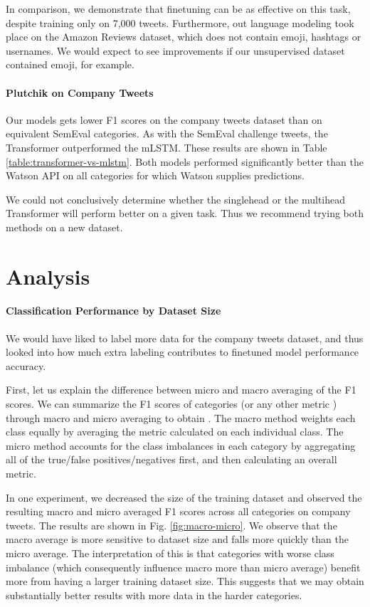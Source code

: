 \documentclass[letterpaper]{article} \usepackage{aaai19}  \usepackage{times}  \usepackage{helvet}  \usepackage{courier}  \usepackage{url}  \usepackage{graphicx}  \usepackage{booktabs}
\begin{document}
In comparison, we demonstrate that finetuning can be as effective on this task, despite training only on 7,000 tweets. Furthermore, out language modeling took place on the Amazon Reviews dataset, which does not contain emoji, hashtags or usernames. We would expect to see improvements if our unsupervised dataset contained emoji, for example.


\paragraph{Plutchik on Company Tweets}
Our models gets lower F1 scores on  the company tweets dataset than on equivalent SemEval categories. 
As with the SemEval challenge tweets, the Transformer outperformed the mLSTM. These results are shown in Table \ref{table:transformer-vs-mlstm}. Both models performed significantly better than the Watson API on all categories for which Watson supplies predictions.

We could not conclusively determine whether the singlehead or the multihead Transformer will perform better on a given task. Thus we recommend trying both methods on a new dataset.


\section{Analysis}

\paragraph{Classification Performance by Dataset Size}
We would have liked to label more data for the company tweets dataset, and thus looked into how much extra labeling contributes to finetuned model performance accuracy. 

First, let us explain the difference between micro and macro averaging of the F1 scores. We can summarize the F1 scores of categories  (or any other metric ) through macro and micro averaging to obtain . The macro method weights each class equally by averaging the metric calculated on each individual class. The micro method accounts for the class imbalances in each category by aggregating all of the true/false positives/negatives first, and then calculating an overall metric. 


In one experiment, we decreased the size of the training dataset and observed the resulting macro and micro averaged F1 scores across all categories on company tweets. The results are shown in Fig. \ref{fig:macro-micro}. We observe that the macro average is more sensitive to dataset size and falls more quickly than the micro average. The interpretation of this is that categories with worse class imbalance (which consequently influence macro more than micro average) benefit more from having a larger training dataset size. This suggests that we may obtain substantially better results with more data in the harder categories.
\end{document}
